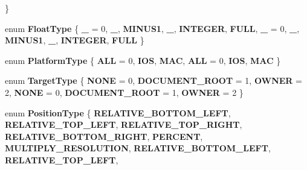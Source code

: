 \begin{DoxyCompactItemize}
 \}
\item 
\mbox{\label{classcocosbuilder_1_1CCBReader_a57b6125313b85143f13b37ad9c129c6e}} 
enum {\bfseries Float\+Type} \{ \newline
{\bfseries \+\_} = 0, 
{\bfseries \+\_}, 
{\bfseries M\+I\+N\+U\+S1}, 
{\bfseries \+\_}, 
\newline
{\bfseries I\+N\+T\+E\+G\+ER}, 
{\bfseries F\+U\+LL}, 
{\bfseries \+\_} = 0, 
{\bfseries \+\_}, 
\newline
{\bfseries M\+I\+N\+U\+S1}, 
{\bfseries \+\_}, 
{\bfseries I\+N\+T\+E\+G\+ER}, 
{\bfseries F\+U\+LL}
 \}
\item 
\mbox{\label{classcocosbuilder_1_1CCBReader_a512fe38b200d3ed650bf0281ea3425ff}} 
enum {\bfseries Platform\+Type} \{ \newline
{\bfseries A\+LL} = 0, 
{\bfseries I\+OS}, 
{\bfseries M\+AC}, 
{\bfseries A\+LL} = 0, 
\newline
{\bfseries I\+OS}, 
{\bfseries M\+AC}
 \}
\item 
\mbox{\label{classcocosbuilder_1_1CCBReader_a0735867cae396dfa6ea8d1fbd1cf0da0}} 
enum {\bfseries Target\+Type} \{ \newline
{\bfseries N\+O\+NE} = 0, 
{\bfseries D\+O\+C\+U\+M\+E\+N\+T\+\_\+\+R\+O\+OT} = 1, 
{\bfseries O\+W\+N\+ER} = 2, 
{\bfseries N\+O\+NE} = 0, 
\newline
{\bfseries D\+O\+C\+U\+M\+E\+N\+T\+\_\+\+R\+O\+OT} = 1, 
{\bfseries O\+W\+N\+ER} = 2
 \}
\item 
\mbox{\label{classcocosbuilder_1_1CCBReader_a6ae9bd5d822cfb0d42615bda33766500}} 
enum {\bfseries Position\+Type} \{ \newline
{\bfseries R\+E\+L\+A\+T\+I\+V\+E\+\_\+\+B\+O\+T\+T\+O\+M\+\_\+\+L\+E\+FT}, 
{\bfseries R\+E\+L\+A\+T\+I\+V\+E\+\_\+\+T\+O\+P\+\_\+\+L\+E\+FT}, 
{\bfseries R\+E\+L\+A\+T\+I\+V\+E\+\_\+\+T\+O\+P\+\_\+\+R\+I\+G\+HT}, 
{\bfseries R\+E\+L\+A\+T\+I\+V\+E\+\_\+\+B\+O\+T\+T\+O\+M\+\_\+\+R\+I\+G\+HT}, 
\newline
{\bfseries P\+E\+R\+C\+E\+NT}, 
{\bfseries M\+U\+L\+T\+I\+P\+L\+Y\+\_\+\+R\+E\+S\+O\+L\+U\+T\+I\+ON}, 
{\bfseries R\+E\+L\+A\+T\+I\+V\+E\+\_\+\+B\+O\+T\+T\+O\+M\+\_\+\+L\+E\+FT}, 
{\bfseries R\+E\+L\+A\+T\+I\+V\+E\+\_\+\+T\+O\+P\+\_\+\+L\+E\+FT}, 

\end{DoxyCompactItemize}
